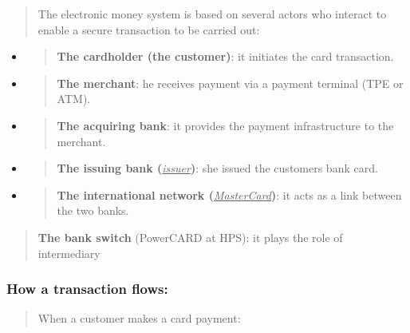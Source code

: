 \documentclass[12pt,a4paper]{report}
\begin{document}
\begin{quote}
The electronic money system is based on several actors who interact to
enable a secure transaction to be carried out:
\end{quote}

\begin{itemize}
\item
  \begin{quote}
  \textbf{The cardholder (the customer)}: it initiates the card
  transaction.
  \end{quote}
\item
  \begin{quote}
  \textbf{The merchant}: he receives payment via a payment terminal (TPE
  or ATM).
  \end{quote}
\item
  \begin{quote}
  \textbf{The acquiring bank}: it provides the payment infrastructure to
  the merchant.
  \end{quote}
\item
  \begin{quote}
  \textbf{The issuing bank (}\emph{\uline{issuer}}\textbf{)}: she issued
  the customer\textquotesingle s bank card.
  \end{quote}
\item
  \begin{quote}
  \textbf{The international network
  (}\emph{\uline{MasterCard}}\textbf{)}: it acts as a link between the
  two banks.
  \end{quote}
\end{itemize}

\begin{quote}
\textbf{The bank switch} (PowerCARD at HPS): it plays the role of
intermediary
\end{quote}

\hypertarget{how-a-transaction-flows}{%
\subsubsection{\texorpdfstring{\textbf{How a transaction
flows:}}{How a transaction flows:}}\label{how-a-transaction-flows}}

\begin{quote}
When a customer makes a card payment:
\end{quote}
\end{document}
